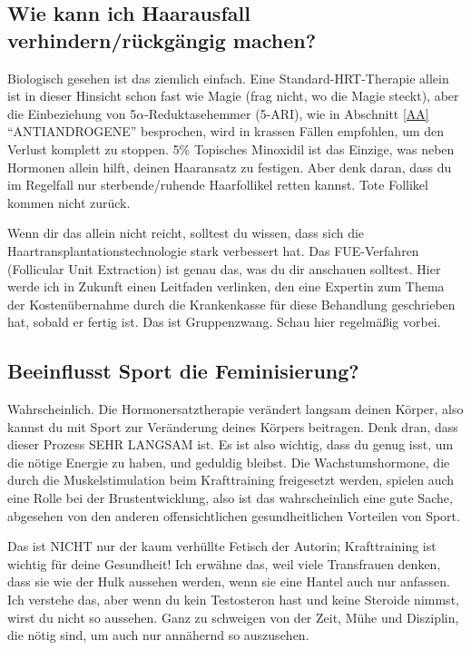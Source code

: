 \documentclass{article}
\begin{document}
\subsection{Wie kann ich Haarausfall verhindern/rückgängig machen?}\label{11-14}

Biologisch gesehen ist das ziemlich einfach. Eine Standard-HRT-Therapie allein ist in dieser Hinsicht schon fast wie Magie (frag nicht, wo die Magie steckt), aber die Einbeziehung von 5$\alpha$-Reduktasehemmer (5-ARI), wie in Abschnitt \ref{AA} “ANTIANDROGENE” besprochen, wird in krassen Fällen empfohlen, um den Verlust komplett zu stoppen. 5\% Topisches Minoxidil ist das Einzige, was neben Hormonen allein hilft, deinen Haaransatz zu festigen. Aber denk daran, dass du im Regelfall nur sterbende/ruhende Haarfollikel retten kannst. Tote Follikel kommen nicht zurück.

Wenn dir das allein nicht reicht, solltest du wissen, dass sich die Haartransplantationstechnologie stark verbessert hat. Das FUE-Verfahren (Follicular Unit Extraction) ist genau das, was du dir anschauen solltest. Hier werde ich in Zukunft einen Leitfaden verlinken, den eine Expertin zum Thema der Kostenübernahme durch die Krankenkasse für diese Behandlung geschrieben hat, sobald er fertig ist. Das ist Gruppenzwang. Schau hier regelmäßig vorbei.

\subsection{Beeinflusst Sport die Feminisierung?}

Wahrscheinlich. Die Hormonersatztherapie verändert langsam deinen Körper, also kannst du mit Sport zur Veränderung deines Körpers beitragen. Denk dran, dass dieser Prozess SEHR LANGSAM ist. Es ist also wichtig, dass du genug isst, um die nötige Energie zu haben, und geduldig bleibst. Die Wachstumshormone, die durch die Muskelstimulation beim Krafttraining freigesetzt werden, spielen auch eine Rolle bei der Brustentwicklung, also ist das wahrscheinlich eine gute Sache, abgesehen von den anderen offensichtlichen gesundheitlichen Vorteilen von Sport.

Das ist NICHT nur der kaum verhüllte Fetisch der Autorin; Krafttraining ist wichtig für deine Gesundheit! Ich erwähne das, weil viele Transfrauen denken, dass sie wie der Hulk aussehen werden, wenn sie eine Hantel auch nur anfassen. Ich verstehe das, aber wenn du kein Testosteron hast und keine Steroide nimmst, wirst du nicht so aussehen. Ganz zu schweigen von der Zeit, Mühe und Disziplin, die nötig sind, um auch nur annähernd so auszusehen.
\end{document}
